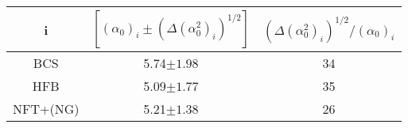 \begin{table}
\begin{center}
\begin{tabular}{|c|c|c|}
\hline
i&$\left[(\alpha_0)_i\pm(\Delta(\alpha_0^2)_i)^{1/2}\right]$ & $(\Delta(\alpha_0^2)_i)^{1/2}/(\alpha_0)_i$\\
\hline
BCS&5.74$\pm 1.98$& 34\\
\hline
HFB&5.09$\pm 1.77$ &35\\
\hline
NFT+(NG)&5.21$\pm 1.38$& 26\\
\hline
\end{tabular}
\end{center}
\caption{}\label{tab6.6.4}
\end{table} 
